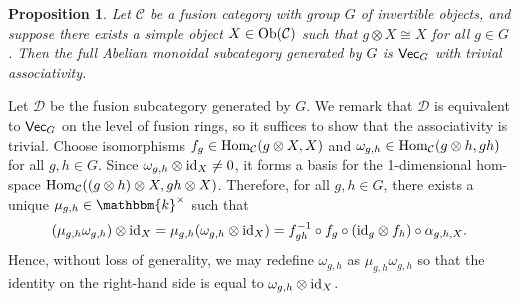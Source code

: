 \documentclass[12pt, reqno]{amsart}
\numberwithin{equation}{section}
\theoremstyle{plainspace}
\newtheorem{proposition}[theorem]{Proposition}
\theoremstyle{definitionspace}
\theoremstyle{remarkspace}
\renewenvironment{proof}{{\noindent\textbf{Proof.}}}{\null\hfill\qedsymbol}
\newcommand{\id}{\textup{id}}
\newcommand{\mathcat}[1]{\mathcal{#1}}
\newcommand{\Ob}{\textup{Ob}}
\newcommand{\Hom}[2][]{
	\ifthenelse{\equal{#2}{}}
		{\textup{Hom}_{#1}}
		{\textup{Hom}_{#1}\!\left(#2\right)}
}
\newcommand{\textcat}[1]{\textup{\textsf{#1}}}
\begin{document}
\begin{proposition}\label{prop:near-group_trivial_associativity} \cite[Remark 3.2]{Izumi_2015}
Let $\mathcat{C}$ be a fusion category with group $G$ of invertible objects, and suppose there exists a simple object $X \in \Ob(\mathcat{C})$ such that $g \otimes X \cong X$ for all $g \in G$. Then the full Abelian monoidal subcategory generated by $G$ is $\textcat{Vec}_G$ with trivial associativity.
\end{proposition}
\leavevmode\newline
\begin{proof}
\noindent Let $\mathcat{D}$ be the fusion subcategory generated by $G$. We remark that $\mathcat{D}$ is equivalent to $\textcat{Vec}_G$ on the level of fusion rings, so it suffices to show that the associativity is trivial. Choose isomorphisms $f_g \in \Hom[\mathcat{C}]{g \otimes X, X}$ and $\omega_{g,h} \in \Hom[\mathcat{C}]{g \otimes h, gh}$ for all $g, h \in G$. Since $\omega_{g,h} \otimes \id_X \neq 0$, it forms a basis for the 1-dimensional hom-space $\Hom[\mathcat{C}]{(g \otimes h) \otimes X, gh \otimes X}$. Therefore, for all $g, h \in G$, there exists a unique $\mu_{g,h} \in \mathbbm{k}^{\times}$ such that
\begin{align*}
\begin{split}
(\mu_{g,h}\omega_{g,h}) \otimes \id_X = \mu_{g,h}(\omega_{g,h} \otimes \id_X) = f_{gh}^{-1} \circ f_g \circ (\id_g \otimes f_h) \circ \alpha_{g,h,X}.
\end{split}
\end{align*}
\noindent Hence, without loss of generality, we may redefine $\omega_{g,h}$ as $\mu_{g,h}\omega_{g,h}$ so that the identity on the right-hand side is equal to $\omega_{g,h} \otimes \id_X$.
\newline


\end{proof}
\end{document}
